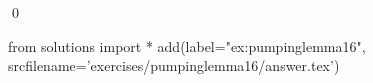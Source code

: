 
\begin{ex} 
  \label{ex:pumpinglemma16}
  
  \qed
\end{ex} 
\begin{python0}
from solutions import *
add(label="ex:pumpinglemma16",
    srcfilename='exercises/pumpinglemma16/answer.tex') 
\end{python0}
